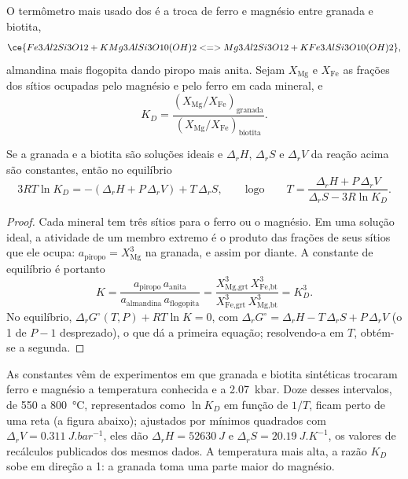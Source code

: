O termômetro mais usado dos  é a troca de ferro e magnésio
entre granada e biotita,
\[
\ce{Fe3Al2Si3O12 + KMg3AlSi3O10(OH)2 <=> Mg3Al2Si3O12 + KFe3AlSi3O10(OH)2},
\]
almandina mais flogopita dando piropo mais anita. Sejam $X_{\text{Mg}}$ e $X_{\text{Fe}}$
as frações dos sítios ocupadas pelo magnésio e pelo ferro em cada mineral, e
\[
K_D = \frac{(X_{\text{Mg}}/X_{\text{Fe}})_{\text{granada}}}{(X_{\text{Mg}}/X_{\text{Fe}})_{\text{biotita}}}.
\]

\begin{proposition}\label{prop:b2:pt-paths:exchange}
Se a granada e a biotita são soluções ideais e $\Delta_r H$, $\Delta_r S$ e $\Delta_r V$ da
reação acima são constantes, então no equilíbrio
\[
3RT\ln K_D = -(\Delta_r H + P\,\Delta_r V) + T\,\Delta_r S,
\qquad\text{logo}\qquad
T = \frac{\Delta_r H + P\,\Delta_r V}{\Delta_r S - 3R\ln K_D}.
\]
\end{proposition}

\begin{proof}
Cada mineral tem três sítios para o ferro ou o magnésio. Em uma solução ideal, a atividade de
um membro extremo é o produto das frações de seus sítios que ele ocupa: $a_{\text{piropo}} =
X_{\text{Mg}}^3$ na granada, e assim por diante. A constante de equilíbrio é portanto
\[
K = \frac{a_{\text{piropo}}\,a_{\text{anita}}}{a_{\text{almandina}}\,a_{\text{flogopita}}}
= \frac{X_{\text{Mg,grt}}^3\,X_{\text{Fe,bt}}^3}{X_{\text{Fe,grt}}^3\,X_{\text{Mg,bt}}^3} = K_D^3 .
\]
No equilíbrio, $\Delta_r G^\circ(T, P) + RT\ln K = 0$, com $\Delta_r G^\circ = \Delta_r H -
T\,\Delta_r S + P\,\Delta_r V$ (o 1 de $P - 1$ desprezado), o que dá a primeira equação;
resolvendo-a em $T$, obtém-se a segunda.
\end{proof}

As constantes vêm de experimentos em que granada e biotita sintéticas trocaram ferro
e magnésio a temperatura conhecida e a \qty{2.07}{kbar}. Doze desses intervalos, de 550 a
\qty{800}{\celsius}, representados como $\ln K_D$ em função de $1/T$, ficam perto de uma reta (a figura
abaixo); ajustados por mínimos quadrados com $\Delta_r V = \qty{0.311}{J.bar^{-1}}$, eles dão
$\Delta_r H = \qty{52630}{J}$ e $\Delta_r S = \qty{20.19}{J.K^{-1}}$, os valores de
recálculos publicados dos mesmos dados. A temperatura mais alta, a razão $K_D$ sobe
em direção a 1: a granada toma uma parte maior do magnésio.

